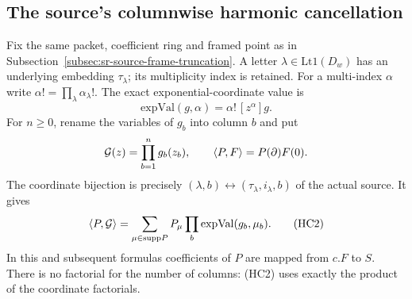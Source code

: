 \subsection{The source's columnwise harmonic cancellation}
\label{subsec:sr-source-harmonic-chart-cancellation}

Fix the same packet, coefficient ring and framed point
as in Subsection~\ref{subsec:sr-source-frame-truncation}.
A letter \(\lambda\in\mathrm{Lt1}(D_w)\) has an
underlying embedding \(\tau_\lambda\); its multiplicity
index is retained.
For a multi-index \(\alpha\) write
\(\alpha!=\prod_\lambda\alpha_\lambda!\).
The exact exponential-coordinate value is
\[
 \mathrm{expVal}(g,\alpha)=
      \alpha!\,[z^\alpha]g .
 \tag{HC1}
\]
For \(n\ge0\), rename the variables of \(g_b\) into
column \(b\) and put
\[
 {\cal G}(z)=\prod_{b=1}^n g_b(z_b),\qquad
 \langle P,F\rangle=P(\partial)F(0).
\]
The coordinate bijection is precisely
\((\lambda,b)\leftrightarrow(\tau_\lambda,i_\lambda,b)\)
of the actual source.  It gives
\[
 \langle P,{\cal G}\rangle
 =\sum_{\mu\in\mathrm{supp}P}P_\mu
                 \prod_b\mathrm{expVal}(g_b,\mu_b).
 \tag{HC2}
\]
In this and subsequent formulas coefficients of \(P\)
are mapped from \(c.F\) to \(S\).
There is no factorial for the number of columns:
(HC2) uses exactly the product of the coordinate
factorials.

